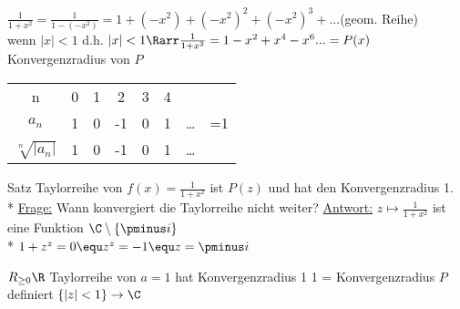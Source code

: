 $\frac{1}{1+x^2} = \frac{1}{1 - (-x^2)} = 1 + (-x^2) + (-x^2)^2 + (-x^2)^3 + ... $(geom. Reihe)\\
wenn $|x| < 1$ d.h. $|x| < 1 \Rarr \frac{1}{1+x^2} = 1 - x^2 + x^4 - x^6 ... = P(x)$\\
Konvergenzradius von $P$
\begin{tabular}{c|cccccc|c}
n&0&1&2&3&4&&\hline
\\$a_n$&1&0&-1&0&1&…&=1
\\$\sqrt[n]{|a_n|}$
&1&0&-1&0&1&…&\end{tabular}

Satz \Rarr{} Taylorreihe von $f(x) = \frac{1}{1 + x^2}$ ist $P(z)$ und hat den Konvergenzradius 1.\\*
\ul{Frage:} Wann konvergiert die Taylorreihe nicht weiter?
\ul{Antwort:} $z \mapsto \frac{1}{1 + x^2}$ ist eine Funktion $\C \setminus \{\pminus i\}$\\*
$1+z^z = 0 \equ z^z = -1 \equ z = \pminus i$

$R_{\geq 0} \R$ Taylorreihe von $a=1$ hat Konvergenzradius 1
1 = Konvergenzradius \Rarr{} $P$ definiert $\{|z| < 1\} \to \C$


